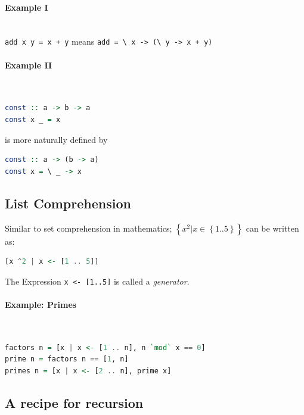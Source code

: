 \paragraph{Example I} \hfill \\
\lstinline|add x y = x + y| means \lstinline|add = \ x -> (\ y -> x + y)|

\paragraph{Example II} \hfill \\
\begin{lstlisting}[language=Haskell]
const :: a -> b -> a
const x _ = x 
\end{lstlisting}
is more naturally defined by

\begin{lstlisting}[language=Haskell]
const :: a -> (b -> a)
const x = \ _ -> x
\end{lstlisting}


\subsection{List Comprehension}

Similar to set comprehension in mathematics; $\left\{x^2 | x \in \left\{1..5\right\}\right\}$ can be written as:

\begin{lstlisting}[language=Haskell]
[x ^2 | x <- [1 .. 5]]
\end{lstlisting}

The Expression \lstinline|x <- [1..5]| is called a \emph{generator}.


\paragraph{Example: Primes} \hfill \\
\begin{lstlisting}[language=Haskell]
factors n = [x | x <- [1 .. n], n `mod` x == 0]
prime n = factors n == [1, n]
primes n = [x | x <- [2 .. n], prime x]
\end{lstlisting}


\subsection{A recipe for recursion}

